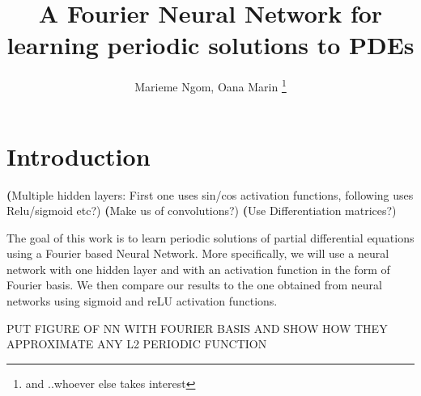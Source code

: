 \documentclass[11pt]{article}
\begin{document}

\title{A Fourier Neural Network for learning periodic solutions to PDEs}
\author{Marieme Ngom, Oana Marin \footnote{and ..whoever else takes interest}}
\maketitle
\begin{abstract}

\end{abstract}




\linenumbers

\section{Introduction}
\textbf(Multiple hidden layers: First one uses sin/cos activation functions, following uses Relu/sigmoid etc?)
\textbf(Make us of convolutions?)
\textbf(Use Differentiation matrices?)


The goal of this work is to learn periodic solutions of partial differential equations using a Fourier based Neural Network. More specifically, we will use a neural network with one hidden layer and with an activation function in the form of Fourier basis. We then compare our results to the one obtained from neural networks using sigmoid and reLU activation functions.

PUT FIGURE OF NN WITH FOURIER BASIS AND SHOW HOW THEY APPROXIMATE ANY L2 PERIODIC  FUNCTION






\end{document}

